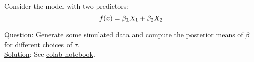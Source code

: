 \begin{itemize}
\begin{example}
Consider the model with two predictors:
\begin{equation*}
f(x) = \beta_1X_1 + \beta_2X_2\\
\end{equation*}


\noindent 
\underline{Question}: Generate some simulated data and compute the posterior means of $\beta$ for different choices of $\tau$. \\


\noindent 
\underline{Solution}: See  \href{https://colab.research.google.com/drive/1sFlY0nvo7hrsNYGRdx8C4tKPihyOSmbx?usp=sharing}{colab notebook}. 

\end{example}
\end{itemize}



